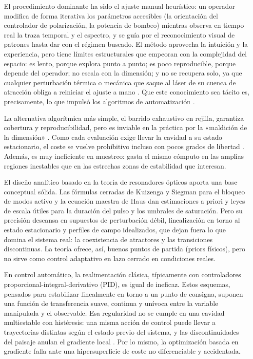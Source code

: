 El procedimiento dominante ha sido el ajuste manual heurístico: un operador modifica de forma iterativa los parámetros accesibles (la orientación del controlador de polarización, la potencia de bombeo) mientras observa en tiempo real la traza temporal y el espectro, y se guía por el reconocimiento visual de patrones hasta dar con el régimen buscado. El método aprovecha la intuición y la experiencia, pero tiene límites estructurales que empeoran con la complejidad del espacio: es lento, porque explora punto a punto; es poco reproducible, porque depende del operador; no escala con la dimensión; y no se recupera solo, ya que cualquier perturbación térmica o mecánica que saque al láser de su cuenca de atracción obliga a reiniciar el ajuste a mano \cite{Pu2019,Pu2020}. Que este conocimiento sea tácito es, precisamente, lo que impulsó los algoritmos de automatización \cite{Pu2019}.

La alternativa algorítmica más simple, el barrido exhaustivo en rejilla, garantiza cobertura y reproducibilidad, pero es inviable en la práctica por la «maldición de la dimensión» \cite{Bellman1966}. Como cada evaluación exige llevar la cavidad a su estado estacionario, el coste se vuelve prohibitivo incluso con pocos grados de libertad \cite{Andral2015}. Además, es muy ineficiente en muestreo: gasta el mismo cómputo en las amplias regiones inestables que en las estrechas zonas de estabilidad que interesan.

El diseño analítico basado en la teoría de resonadores ópticos aporta una base conceptual sólida. Las fórmulas cerradas de Kuizenga y Siegman para el bloqueo de modos activo \cite{KuizengaSiegman1970} y la ecuación maestra de Haus \cite{Haus2000} dan estimaciones a priori y leyes de escala útiles para la duración del pulso y los umbrales de saturación. Pero su precisión descansa en supuestos de perturbación débil, linealización en torno al estado estacionario y perfiles de campo idealizados, que dejan fuera lo que domina el sistema real: la coexistencia de atractores y las transiciones discontinuas. La teoría ofrece, así, buenos puntos de partida (priors físicos), pero no sirve como control adaptativo en lazo cerrado en condiciones reales.

En control automático, la realimentación clásica, típicamente con controladores proporcional-integral-derivativo (PID), es igual de ineficaz. Estos esquemas, pensados para estabilizar linealmente en torno a un punto de consigna, suponen una función de transferencia suave, continua y unívoca entre la variable manipulada y el observable. Esa regularidad no se cumple en una cavidad multiestable con histéresis: una misma acción de control puede llevar a trayectorias distintas según el estado previo del sistema, y las discontinuidades del paisaje anulan el gradiente local \cite{Kokhanovskiy2022,Slotine1991}. Por lo mismo, la optimización basada en gradiente falla ante una hipersuperficie de coste no diferenciable y accidentada.

